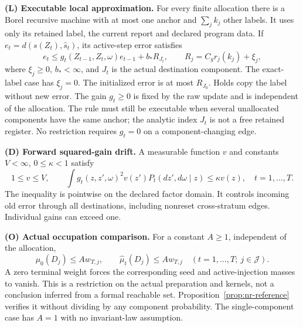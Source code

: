 \smallskip\noindent\textbf{(L) Executable local approximation.}
For every finite allocation there is a Borel recursive machine with at most one anchor and $\sum_jk_j$ other labels. It uses only its retained label, the current report and declared program data. If $e_t=d(s(Z_t),\widehat s_t)$, its active-step error satisfies
\begin{equation}\label{eq:nr-local}
 e_t\le g_t(Z_{t-1},Z_t,\omega)e_{t-1}+b_*R_{J_t},
 \qquad R_j=C_g r_j(k_j)+\xi_j,
\end{equation}
where $\xi_j\ge0$, $b_*<\infty$, and $J_t$ is the actual destination component. The exact-label case has $\xi_j=0$. The initialized error is at most $R_{J_0}$. Holds copy the label without new error. The gain $g_t\ge0$ is fixed by the raw update and is independent of the allocation. The rule must still be executable when several unallocated components have the same anchor; the analytic index $J_t$ is not a free retained register. No restriction requires $g_t=0$ on a component-changing edge.

\smallskip\noindent\textbf{(D) Forward squared-gain drift.}
A measurable function $v$ and constants $V<\infty$, $0\le\kappa<1$ satisfy
\begin{equation}\label{eq:nr-drift}
 1\le v\le V,\qquad
 \int g_t(z,z',\omega)^2v(z')P_t(dz',d\omega\mid z)
       \le\kappa v(z),\quad t=1,\ldots,T.
\end{equation}
The inequality is pointwise on the declared factor domain. It controls incoming old error through all destinations, including nonreset cross-stratum edges. Individual gains can exceed one.

\smallskip\noindent\textbf{(O) Actual occupation comparison.}
For a constant $A\ge1$, independent of the allocation,
\begin{equation}\label{eq:nr-occupation}
 \mu_0(D_j)\le A w_{T,j},\qquad
 \widehat\mu_t(D_j)\le A w_{T,j}\quad(t=1,\ldots,T;\ j\in\mathcal J).
\end{equation}
A zero terminal weight forces the corresponding seed and active-injection masses to vanish. This is a restriction on the actual preparation and kernels, not a conclusion inferred from a formal reachable set. Proposition~\ref{prop:nr-reference} verifies it without dividing by any component probability. The single-component case has $A=1$ with no invariant-law assumption.

